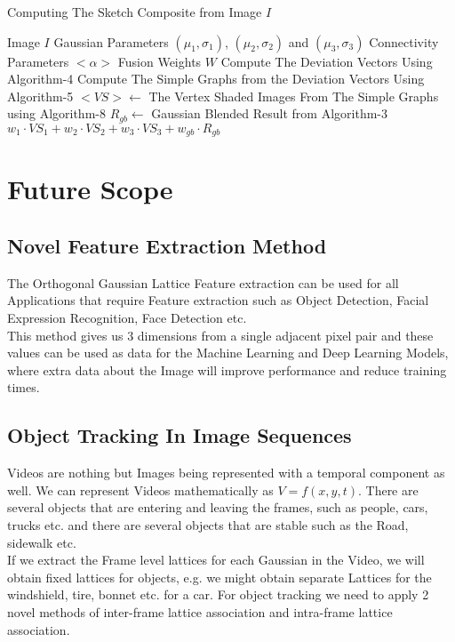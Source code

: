 \documentclass{article}
\begin{document}
\begin{algorithm}
\caption{Computing The Sketch Composite from Image $I$}
    \begin{algorithmic}
        \REQUIRE Image $I$
        \REQUIRE Gaussian Parameters $(\mu_1, \sigma_1)$, $(\mu_2, \sigma_2)$ and $(\mu_3, \sigma_3)$
        \REQUIRE Connectivity Parameters $<\alpha>$
        \REQUIRE Fusion Weights $W$
        \STATE Compute The Deviation Vectors Using Algorithm-4
        \STATE Compute The Simple Graphs from the Deviation Vectors Using Algorithm-5
        \STATE $<{VS}> \gets$ The Vertex Shaded Images From The Simple Graphs using Algorithm-8
        \STATE $R_{gb} \gets$ Gaussian Blended Result from Algorithm-3
        \RETURN $w_1 \cdot {VS}_1 + w_2 \cdot {VS}_2 + w_3 \cdot {VS}_3 + w_{gb} \cdot R_{gb}$
    \end{algorithmic}
\end{algorithm}

\clearpage
\section{Future Scope}
\subsection{Novel Feature Extraction Method}
The Orthogonal Gaussian Lattice Feature extraction can be used for all Applications that require Feature extraction such as Object Detection, Facial Expression Recognition, Face Detection etc. \\

This method gives us 3 dimensions from a single adjacent pixel pair and these values can be used as data for the Machine Learning and Deep Learning Models, where extra data about the Image will improve performance and reduce training times.


\subsection{Object Tracking In Image Sequences}
Videos are nothing but Images being represented  with a temporal component as well. We can represent Videos mathematically as $V = f(x, y, t)$. There are several objects that are entering and leaving the frames, such as people, cars, trucks etc. and there are several
objects that are stable such as the Road, sidewalk etc. \\

If we extract the Frame level lattices for each Gaussian in the Video, we will obtain fixed lattices for objects, e.g. we might obtain separate Lattices for the windshield, tire, bonnet etc. for a car. For object tracking we need to apply 2 novel methods of inter-frame lattice association and intra-frame lattice association. \\
\end{document}
